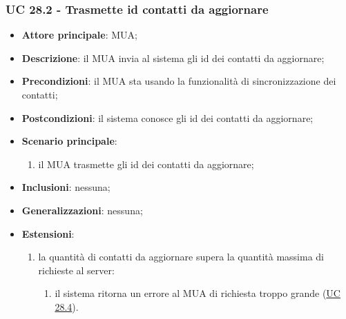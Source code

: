     \subsubsection{UC 28.2 - Trasmette id contatti da aggiornare} \label{sec:UC28.2}
    \begin{itemize}
        \item \textbf{Attore principale}: MUA;
        \item \textbf{Descrizione}: il MUA invia al sistema gli id dei contatti da aggiornare;
        \item \textbf{Precondizioni}: il MUA sta usando la funzionalità di sincronizzazione dei contatti;
        \item \textbf{Postcondizioni}: il sistema conosce gli id dei contatti da aggiornare;
        \item \textbf{Scenario principale}:
            \begin{enumerate}
                \item il MUA trasmette gli id dei contatti da aggiornare;
            \end{enumerate}
        \item \textbf{Inclusioni}: nessuna;
        \item \textbf{Generalizzazioni}: nessuna;
        \item \textbf{Estensioni}:
            \begin{enumerate}[label=\alph*.]
                \item la quantità di contatti da aggiornare supera la quantità massima di richieste al server:
                \begin{enumerate}[label=\arabic*.]
                    \item il sistema ritorna un errore al MUA di richiesta troppo grande (\hyperref[sec:UC28.4]{UC 28.4}).
                \end{enumerate}
            \end{enumerate}
    \end{itemize}


